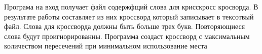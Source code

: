 Програма на вход получает файл содержфщий слова для крисскросс кросворда. В результате работы составляет из них кроссворд который записывает в тексотвый файл. Слова для кроссворда должны быть больше трех букв. Повторяющиеся слова будут проигнорированны. Программа создаст кроссворд с максимальным количеством пересечений при минимальном использование места 